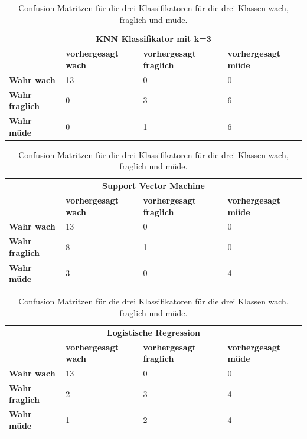 \begin{table}
    \centering
    \scriptsize
    \begin{tabular}{llll}
    \multicolumn{4}{c}{\textbf{KNN Klassifikator mit k=3}} \\
    & \textbf{vorhergesagt wach} & \textbf{vorhergesagt fraglich} & \textbf{vorhergesagt müde} \\ \hline
    \textbf{Wahr wach} & 13 & 0 & 0 \\ 
    \textbf{Wahr fraglich} & 0 & 3 & 6 \\ 
    \textbf{Wahr müde} & 0 & 1 & 6 \\ 
    \end{tabular}
    
    \vspace{0.5cm} %
    
    \begin{tabular}{llll}

    \multicolumn{4}{c}{\textbf{Support Vector Machine}} \\ 
    & \textbf{vorhergesagt wach} & \textbf{vorhergesagt fraglich} & \textbf{vorhergesagt müde} \\ \hline
    \textbf{Wahr wach} & 13 & 0 & 0 \\ 
    \textbf{Wahr fraglich} & 8 & 1 & 0 \\ 
    \textbf{Wahr müde} & 3 & 0 & 4 \\ 
    \end{tabular}
    
    \vspace{0.5cm} %
    
    \begin{tabular}{llll}

    \multicolumn{4}{c}{\textbf{Logistische Regression}} \\ 
    & \textbf{vorhergesagt wach} & \textbf{vorhergesagt fraglich} & \textbf{vorhergesagt müde} \\ \hline
    \textbf{Wahr wach} & 13 & 0 & 0 \\ 
    \textbf{Wahr fraglich} & 2 & 3 & 4 \\ 
    \textbf{Wahr müde} & 1 & 2 & 4 \\ 
    \end{tabular}

\caption{Confusion Matritzen für die drei Klassifikatoren für die drei Klassen wach, fraglich und müde.}
\label{table:confusionmatrixthreeclasses}
\end{table}



